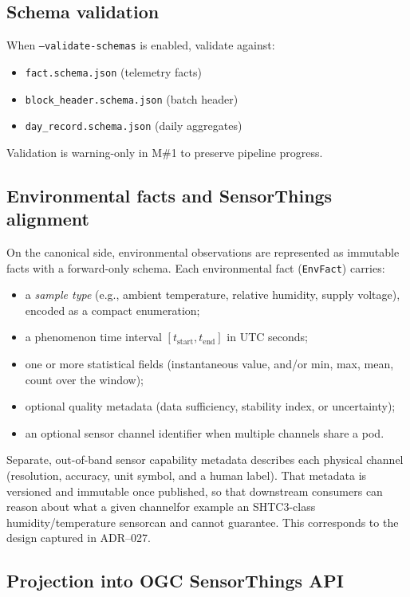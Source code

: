 \subsection{Schema validation}
When \texttt{--validate-schemas} is enabled, validate against:
\begin{itemize}[nosep]
  \item \texttt{fact.schema.json} (telemetry facts)
  \item \texttt{block\_header.schema.json} (batch header)
  \item \texttt{day\_record.schema.json} (daily aggregates)
\end{itemize}
Validation is warning-only in M\#1 to preserve pipeline progress.

\subsection{Environmental facts and SensorThings alignment}
\label{subsec:env_facts_sensorthings}

On the canonical side, environmental observations are represented as immutable facts with a forward-only schema. Each environmental fact (\texttt{EnvFact}) carries:
\begin{itemize}
  \item a \emph{sample type} (e.g., ambient temperature, relative humidity, supply voltage), encoded as a compact enumeration;
  \item a phenomenon time interval $[t_\text{start}, t_\text{end}]$ in UTC seconds;
  \item one or more statistical fields (instantaneous value, and/or min, max, mean, count over the window);
  \item optional quality metadata (data sufficiency, stability index, or uncertainty);
  \item an optional sensor channel identifier when multiple channels share a pod.
\end{itemize}

Separate, out-of-band sensor capability metadata describes each physical channel (resolution, accuracy, unit symbol, and a human label). That metadata is versioned and immutable once published, so that downstream consumers can reason about what a given channel\textemdash{}for example an SHTC3-class humidity/temperature sensor\textemdash{}can and cannot guarantee. This corresponds to the design captured in ADR--027.

\subsection{Projection into OGC SensorThings API}
\label{subsec:projection_sensorthings}

